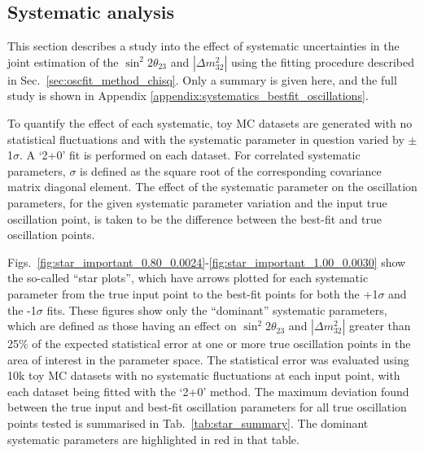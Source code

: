 \subsection {Systematic analysis}
\label{sec:fit_syst_analysis}

This section describes a study into the effect of systematic uncertainties in the joint estimation of the
$\sin^{2}2\theta_{23}$ and $|\Delta m^{2}_{32}|$ using the fitting procedure described in Sec.\ \ref{sec:oscfit_method_chisq}. 
Only a summary is given here, and the full study is shown in Appendix \ref{appendix:systematics_bestfit_oscillations}.

To quantify the effect of each systematic, toy MC datasets are generated with no statistical fluctuations
and with the systematic parameter in question varied by $\pm$1$\sigma$. A `2+0' fit is performed on each dataset.
For correlated systematic parameters, $\sigma$ is defined as the square root of the 
corresponding covariance matrix diagonal element.
The effect of the systematic parameter on the oscillation parameters, for the given systematic parameter variation
and the input true oscillation point, is taken to be the difference between the best-fit and true oscillation points.

Figs.\ \ref{fig:star_important_0.80_0.0024}-\ref{fig:star_important_1.00_0.0030} 
show the so-called ``star plots'', 
which have arrows plotted for each systematic parameter from the true input point to the best-fit points for both the +1$\sigma$ 
and the -1$\sigma$ fits.
These figures show only the ``dominant'' systematic parameters,
which are defined as those having an effect on
$\sin^{2}2\theta_{23}$ and $|\Delta m^{2}_{32}|$ greater than 25\% of the expected statistical error 
at one or more true oscillation points in the area of interest in the parameter space.
The statistical error was evaluated using 10k toy MC datasets with no systematic fluctuations at each input point, 
with each dataset being fitted with the `2+0' method.
The maximum deviation found between the true input and best-fit oscillation parameters for all true oscillation points tested
is summarised in Tab.\ \ref{tab:star_summary}. 
The dominant systematic parameters are highlighted in red in that table.

